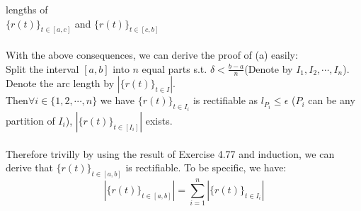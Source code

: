 \documentclass{article}
\begin{document}
{    lengths of \\ $\{r(t)\}_{t\in[a,c]}$ and $\{r(t)\}_{t\in[c,b]}$ \\\\
    With the above consequences, we can derive the proof of (a) easily:\\
    Split the interval $[a,b]$ into $n$ equal parts s.t. $\delta<\frac{b-a}{n}$(Denote by
    $I_1,I_2,\cdots,I_{n}$).\\
    Denote the arc length by $|\{r(t)\}_{t\in I}|$.\\
    Then$\forall i\in \{1,2,\cdots,n\}$ we have $\{r(t)\}_{t\in I_i}$ is rectifiable as 
    $l_{P_i}\leq \epsilon$ ($P_i$ can be any partition of $I_i$), $|\{r(t)\}_{t\in [I_i]}|$ exists.\\\\
    Therefore trivilly by using the result of Exercise 4.77 and induction, we can derive that  $\{r(t)\}_{t\in [a,b]}$ is rectifiable. To be specific, we have:
    $$|\{r(t)\}_{t\in [a,b]}|=\sum_{i=1}^{n}|\{r(t)\}_{t\in I_i}|$$

}
\end{document}
